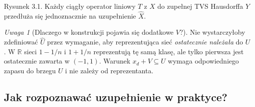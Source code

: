 \documentclass[11pt,a4paper]{article}
\numberwithin{equation}{section}
\theoremstyle{plain}
\theoremstyle{definition}
\theoremstyle{remark}
\newtheorem{uwaga}[twierdzenie]{Uwaga}
\newcommand{\R}{\mathbb R}
\begin{document}
\begin{center}

{\small Rysunek 3.1. Każdy ciągły operator liniowy $T$ z $X$
do zupełnej TVS Hausdorffa $Y$ przedłuża się jednoznacznie
na uzupełnienie $\widehat X$.}
\end{center}

\begin{uwaga}[Dlaczego w konstrukcji pojawia się dodatkowe $V$?]
Nie wystarczyłoby zdefiniować $\widehat U$ przez wymaganie,
aby reprezentująca sieć \emph{ostatecznie należała} do $U$.
W $\R$ sieci $1-1/n$ i $1+1/n$ reprezentują tę samą klasę,
ale tylko pierwsza jest ostatecznie zawarta w $(-1,1)$.
Warunek $x_d+V\subseteq U$ wymaga odpowiedniego zapasu
do brzegu $U$ i nie zależy od reprezentanta.
\end{uwaga}

\subsection{Jak rozpoznawać uzupełnienie w praktyce?}
\end{document}
